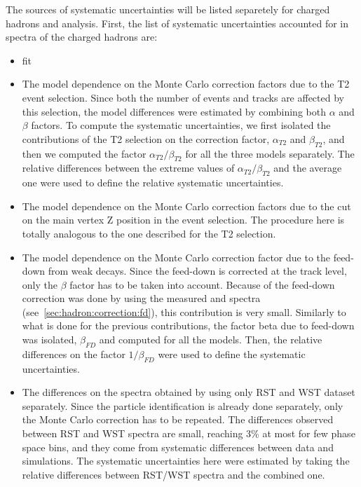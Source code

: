 The sources of systematic uncertainties will be listed
separetely for charged hadrons and \vzero analysis.
First, the list of systematic uncertainties accounted for in
spectra of the charged hadrons are:
\begin{itemize}

\item \dedx fit

\item The model dependence on the Monte Carlo correction factors due to
  the T2 event selection. Since both the number of events and tracks
  are affected by this selection, the model differences were estimated by
  combining both $\alpha$ and $\beta$ factors. To compute the systematic
  uncertainties, we first isolated the contributions of the T2 selection on the
  correction factor, $\alpha_{T2}$ and $\beta_{T2}$, and then we computed
  the factor $\alpha_{T2}/\beta_{T2}$ for all the three models separately.
  The relative differences between the extreme values of $\alpha_{T2}/\beta_{T2}$
  and the average one were used to define the relative systematic uncertainties.

\item The model dependence on the Monte Carlo correction factors due to
  the cut on the main vertex Z position in the event selection.
  The procedure here is totally analogous to the one described for the T2 selection.
  
\item The model dependence on the Monte Carlo correction factor due to
  the feed-down from weak decays. Since the feed-down is corrected
  at the track level, only the $\beta$ factor has to be taken into account.
  Because of the feed-down correction was done by using the measured
  \lambs and \kzeros spectra (see~\cref{sec:hadron:correction:fd}),
  this contribution is very small. Similarly to what is done for the previous
  contributions, the factor beta due to feed-down was isolated, $\beta_{FD}$
  and computed for all the models. Then, the relative differences on the factor
  $1/\beta_{FD}$ were used to define the systematic uncertainties.

\item The differences on the spectra obtained by using only
  RST and WST dataset separately. Since the particle identification
  is already done separately, only the Monte Carlo correction has to be
  repeated. The differences observed between RST and WST spectra are small,
  reaching 3\% at most for few phase space bins, and they come from
  systematic differences between data and simulations. The systematic
  uncertainties here were estimated by taking the relative differences
  between RST/WST spectra and the combined one.
  
\end{itemize}


